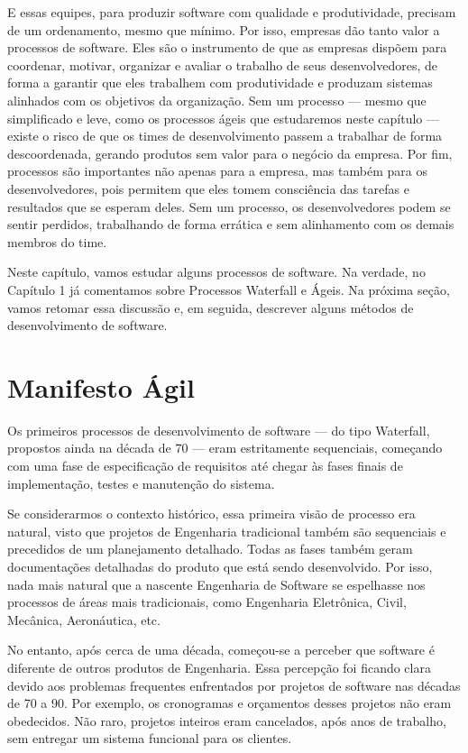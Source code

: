 \documentclass[
  11pt,
  twoside]{book}
\begin{document}
E essas equipes, para produzir software com qualidade e produtividade,
precisam de um ordenamento, mesmo que mínimo. Por isso, empresas dão
tanto valor a processos de software. Eles são o instrumento de que as
empresas dispõem para coordenar, motivar, organizar e avaliar o trabalho
de seus desenvolvedores, de forma a garantir que eles trabalhem com
produtividade e produzam sistemas alinhados com os objetivos da
organização. Sem um processo --- mesmo que simplificado e leve, como os
processos ágeis que estudaremos neste capítulo --- existe o risco de que
os times de desenvolvimento passem a trabalhar de forma descoordenada,
gerando produtos sem valor para o negócio da empresa. Por fim, processos
são importantes não apenas para a empresa, mas também para os
desenvolvedores, pois permitem que eles tomem consciência das tarefas e
resultados que se esperam deles. Sem um processo, os desenvolvedores
podem se sentir perdidos, trabalhando de forma errática e sem
alinhamento com os demais membros do time.

Neste capítulo, vamos estudar alguns processos de software. Na verdade,
no Capítulo 1 já comentamos sobre Processos Waterfall e Ágeis. Na
próxima seção, vamos retomar essa discussão e, em seguida, descrever
alguns métodos de desenvolvimento de software.

\hypertarget{manifesto-uxe1gil}{%
\section{Manifesto Ágil}\label{manifesto-uxe1gil}}

 Os primeiros processos de desenvolvimento de
software --- do tipo Waterfall, propostos ainda na década de 70 --- eram
estritamente sequenciais, começando com uma fase de especificação de
requisitos até chegar às fases finais de implementação, testes e
manutenção do sistema.

Se considerarmos o contexto histórico, essa primeira visão de processo
era natural, visto que projetos de Engenharia tradicional também são
sequenciais e precedidos de um planejamento detalhado. Todas as fases
também geram documentações detalhadas do produto que está sendo
desenvolvido. Por isso, nada mais natural que a nascente Engenharia de
Software se espelhasse nos processos de áreas mais tradicionais, como
Engenharia Eletrônica, Civil, Mecânica, Aeronáutica, etc.

No entanto, após cerca de uma década, começou-se a perceber que software
é diferente de outros produtos de Engenharia. Essa percepção foi ficando
clara devido aos problemas frequentes enfrentados por projetos de
software nas décadas de 70 a 90. Por exemplo, os cronogramas e
orçamentos desses projetos não eram obedecidos. Não raro, projetos
inteiros eram cancelados, após anos de trabalho, sem entregar um sistema
funcional para os clientes.
\end{document}
